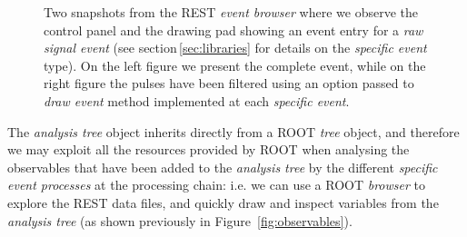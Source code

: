 \begin{figure}[h]
  \centering
	\caption{Two snapshots from the REST \emph{event browser} where we observe the control panel and the drawing pad showing an event entry for a \emph{raw signal event} (see section\,\ref{sec:libraries} for details on the \emph{specific event} type). On the left figure we present the complete event, while on the right figure the pulses have been filtered using an option passed to \emph{draw event} method implemented at each \emph{specific event}.}\label{fig:eventBrowser}
\end{figure}


The \emph{analysis tree} object inherits directly from a ROOT \emph{tree} object, and therefore we may exploit all the resources provided by ROOT when analysing the observables that have been added to the \emph{analysis tree} by the different \emph{specific event processes} at the processing chain: i.e. we can use a ROOT \emph{browser} to explore the REST data files, and quickly draw and inspect  variables from the \emph{analysis tree} (as shown previously in Figure~\ref{fig:observables}).

